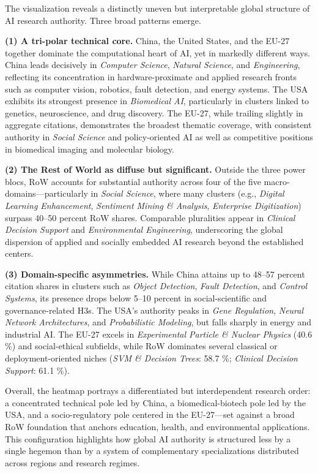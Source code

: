 \documentclass{article}
\begin{document}
The visualization reveals a distinctly uneven but interpretable global structure of AI research authority. Three broad patterns emerge.  

\textbf{(1) A tri-polar technical core.}  
China, the United States, and the EU-27 together dominate the computational heart of AI, yet in markedly different ways. China leads decisively in \emph{Computer Science}, \emph{Natural Science}, and \emph{Engineering}, reflecting its concentration in hardware-proximate and applied research fronts such as computer vision, robotics, fault detection, and energy systems. The USA exhibits its strongest presence in \emph{Biomedical AI}, particularly in clusters linked to genetics, neuroscience, and drug discovery. The EU-27, while trailing slightly in aggregate citations, demonstrates the broadest thematic coverage, with consistent authority in \emph{Social Science} and policy-oriented AI as well as competitive positions in biomedical imaging and molecular biology.  

\textbf{(2) The Rest of World as diffuse but significant.}  
Outside the three power blocs, RoW accounts for substantial authority across four of the five macro-domains—particularly in \emph{Social Science}, where many clusters (e.g., \textit{Digital Learning Enhancement}, \textit{Sentiment Mining \& Analysis}, \textit{Enterprise Digitization}) surpass 40–50 percent RoW shares. Comparable pluralities appear in \textit{Clinical Decision Support} and \textit{Environmental Engineering}, underscoring the global dispersion of applied and socially embedded AI research beyond the established centers.  

\textbf{(3) Domain-specific asymmetries.}  
While China attains up to 48–57 percent citation shares in clusters such as \textit{Object Detection}, \textit{Fault Detection}, and \textit{Control Systems}, its presence drops below 5–10 percent in social-scientific and governance-related H3s. The USA’s authority peaks in \textit{Gene Regulation}, \textit{Neural Network Architectures}, and \textit{Probabilistic Modeling}, but falls sharply in energy and industrial AI. The EU-27 excels in \textit{Experimental Particle \& Nuclear Physics} (40.6 \%) and social-ethical subfields, while RoW dominates several classical or deployment-oriented niches (\textit{SVM \& Decision Trees}: 58.7 \%; \textit{Clinical Decision Support}: 61.1 \%).  

Overall, the heatmap portrays a differentiated but interdependent research order: a concentrated technical pole led by China, a biomedical-biotech pole led by the USA, and a socio-regulatory pole centered in the EU-27—set against a broad RoW foundation that anchors education, health, and environmental applications. This configuration highlights how global AI authority is structured less by a single hegemon than by a system of complementary specializations distributed across regions and research regimes.
\end{document}
